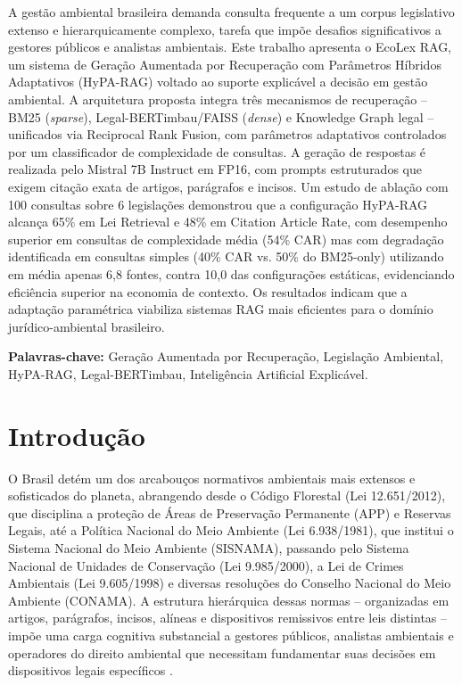 \documentclass[12pt]{article}
\begin{document}
\begin{resumo}
A gestão ambiental brasileira demanda consulta frequente a um corpus legislativo extenso e hierarquicamente complexo, tarefa que impõe desafios significativos a gestores públicos e analistas ambientais. Este trabalho apresenta o EcoLex RAG, um sistema de Geração Aumentada por Recuperação com Parâmetros Híbridos Adaptativos (HyPA-RAG) voltado ao suporte explicável a decisão em gestão ambiental. A arquitetura proposta integra três mecanismos de recuperação -- BM25 (\textit{sparse}), Legal-BERTimbau/FAISS (\textit{dense}) e Knowledge Graph legal -- unificados via Reciprocal Rank Fusion, com parâmetros adaptativos controlados por um classificador de complexidade de consultas. A geração de respostas é realizada pelo Mistral 7B Instruct em FP16, com prompts estruturados que exigem citação exata de artigos, parágrafos e incisos. Um estudo de ablação com 100 consultas sobre 6 legislações demonstrou que a configuração HyPA-RAG alcança 65\% em Lei Retrieval e 48\% em Citation Article Rate, com desempenho superior em consultas de complexidade média (54\% CAR) mas com degradação identificada em consultas simples (40\% CAR vs. 50\% do BM25-only) utilizando em média apenas 6,8 fontes, contra 10,0 das configurações estáticas, evidenciando eficiência superior na economia de contexto. Os resultados indicam que a adaptação paramétrica viabiliza sistemas RAG mais eficientes para o domínio jurídico-ambiental brasileiro.

\textbf{Palavras-chave:} Geração Aumentada por Recuperação, Legislação Ambiental, HyPA-RAG, Legal-BERTimbau, Inteligência Artificial Explicável.
\end{resumo}

\section{Introdução}

O Brasil detém um dos arcabouços normativos ambientais mais extensos e sofisticados do planeta, abrangendo desde o Código Florestal (Lei 12.651/2012), que disciplina a proteção de Áreas de Preservação Permanente (APP) e Reservas Legais, até a Política Nacional do Meio Ambiente (Lei 6.938/1981), que institui o Sistema Nacional do Meio Ambiente (SISNAMA), passando pelo Sistema Nacional de Unidades de Conservação (Lei 9.985/2000), a Lei de Crimes Ambientais (Lei 9.605/1998) e diversas resoluções do Conselho Nacional do Meio Ambiente (CONAMA). A estrutura hierárquica dessas normas -- organizadas em artigos, parágrafos, incisos, alíneas e dispositivos remissivos entre leis distintas -- impõe uma carga cognitiva substancial a gestores públicos, analistas ambientais e operadores do direito ambiental que necessitam fundamentar suas decisões em dispositivos legais específicos \cite{robertson:2009}.
\end{document}

